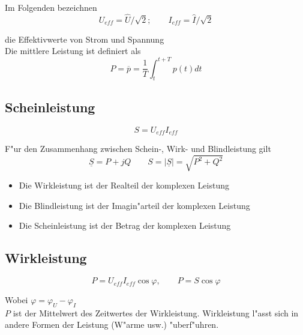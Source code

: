 \documentclass[german, 10pt, a4paper, headsepline]{scrreprt}
\theoremstyle{remark}
\begin{document}
Im Folgenden bezeichnen
\begin{displaymath}
	U_{eff} = \hat{U} / \sqrt{2}; \qquad I_{eff} = \hat{I} / \sqrt{2}
\end{displaymath}

die Effektivwerte von Strom und Spannung \\

Die mittlere Leistung  ist definiert als
\begin{displaymath}
	P = \overline{p} = \frac{1}{T} \int^{t + T}_t p(t) dt
\end{displaymath}

\subsection{Scheinleistung}

\begin{displaymath}
	S=U_{eff}I_{eff}
\end{displaymath}

F"ur den Zusammenhang zwischen Schein-, Wirk- und Blindleistung gilt
\begin{displaymath}
	\underline{S} = P + jQ \qquad S = |\underline{S}| = \sqrt{P^2 + Q^2}
\end{displaymath}

\begin{itemize}
	\item Die Wirkleistung ist der Realteil der komplexen Leistung
	\item Die Blindleistung ist der Imagin"arteil der komplexen Leistung
	\item Die Scheinleistung ist der Betrag der komplexen Leistung
\end{itemize}


\subsection{Wirkleistung}

\begin{displaymath}
	P = U_{eff}I_{eff}\cos\varphi, \qquad P = S \cos \varphi
\end{displaymath}

Wobei $\varphi = \varphi_U-\varphi_I$\\

$P$ ist der Mittelwert des Zeitwertes der Wirkleistung. Wirkleistung l"asst sich in andere Formen der Leistung (W"arme usw.) "uberf"uhren.
\end{document}
